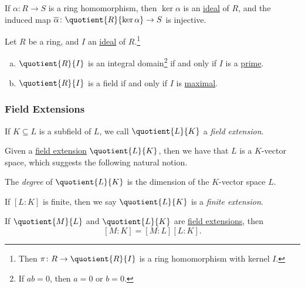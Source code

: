 \begin{theorem}
	If \(\alpha \colon R \to S\) is a ring homomorphism, then \(\ker \alpha \) is an \hyperref[def:ideal]{ideal} of \(R\), and the induced map \(\overline{\alpha} \colon \quotient{R}{\ker \alpha } \to S\) is injective.
\end{theorem}

\begin{theorem}
	Let \(R\) be a ring, and \(I\) an \hyperref[def:ideal]{ideal} of \(R\).\footnote{Then \(\pi \colon R \to \quotient{R}{I} \) is a ring homomorphism with kernel \(I\).}
	\begin{enumerate}[(a)]
		\item \(\quotient{R}{I} \) is an integral domain\footnote{If \(ab=0\), then \(a=0\) or \(b=0\).} if and only if \(I\) is a \hyperref[def:prime]{prime}.
		\item \(\quotient{R}{I} \) is a field if and only if \(I\) is \hyperref[def:proper-ideal-maximal]{maximal}.
	\end{enumerate}
\end{theorem}

\subsubsection{Field Extensions}
\begin{definition}\label{def:field-extension}
	If \(K \subseteq L\) is a subfield of \(L\), we call \(\quotient{L}{K} \) a \emph{field extension}.
\end{definition}

Given a \hyperref[def:field-extension]{field extension} \(\quotient{L}{K} \), then we have that \(L\) is a \(K\)-vector space, which suggests the following natural notion.

\begin{definition}[Degree]\label{def:degree}
	The \emph{degree} of \(\quotient{L}{K} \) is the dimension of the \(K\)-vector space \(L\).
\end{definition}

\begin{notation}
	If \([L\colon K]\) is finite, then we say \(\quotient{L}{K} \) is a \emph{finite extension}.
\end{notation}

\begin{theorem}\label{thm:lec11-1}
	If \(\quotient{M}{L} \) and \(\quotient{L}{K} \) are \hyperref[def:field-extension]{field extensions}, then
	\[
		[M\colon K] = [M \colon L] [L \colon K].
	\]
\end{theorem}

